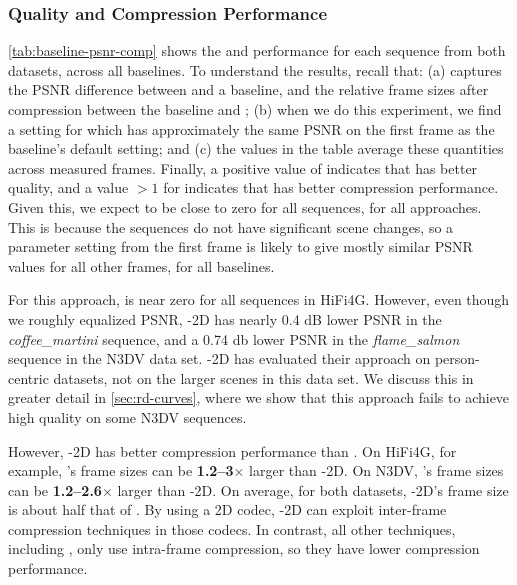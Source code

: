 \subsubsection{Quality and Compression Performance}\label{sec:qual-compr-perf}

\cref{tab:baseline-psnr-comp} shows the \dpsnr{} and \rcr{} performance for each sequence from both datasets, across all baselines.
%
To understand the results, recall that:
%
(a) \dpsnr{} captures the PSNR difference between \gsnfs{} and a baseline, and \rcr{} the relative frame sizes after compression between the baseline and \gsnfs{};
%
(b) when we do this experiment, we find a setting for \gsnfs{} which has approximately the same PSNR on the first frame as the baseline's default setting; and
%
(c) the values in the table average these quantities across measured frames.
%
Finally, a positive value of \dpsnr{} indicates that \gsnfs{} has better quality, and a value $> 1$ for \rcr{} indicates that \gsnfs{} has better compression performance.
Given this, we expect \dpsnr{} to be close to zero for all sequences, for all approaches.
%
This is because the sequences do not have significant scene changes, so a parameter setting from the first frame is likely to give mostly similar PSNR values for all other frames, for all baselines.

%
For this approach, \dpsnr{} is near zero for all sequences in HiFi4G.
%
However, even though we roughly equalized PSNR, \vthree{}-2D has nearly 0.4 dB lower PSNR in the \textit{coffee\_martini} sequence, and a 0.74 db lower PSNR in the \textit{flame\_salmon} sequence in the N3DV data set.
%
\vthree{}-2D has evaluated their approach on person-centric datasets, not on the larger scenes in this data set.
%
We discuss this in greater detail in \cref{sec:rd-curves}, where we show that this approach fails to achieve high quality on some N3DV sequences.

However, \vthree{}-2D has better compression performance than \gsnfs{}.
%
On HiFi4G, for example, \gsnfs{}'s frame sizes can be \textbf{1.2--3}$\times$ larger than \vthree{}-2D.
%
On N3DV, \gsnfs{}'s frame sizes can be \textbf{1.2--2.6}$\times$ larger than \vthree{}-2D.
%
On average, for both datasets, \vthree{}-2D's frame size is about half that of \gsnfs{}.
%
By using a 2D codec, \vthree{}-2D can exploit inter-frame compression techniques in those codecs.
%
In contrast, all other techniques, including \gsnfs{}, only use intra-frame compression, so they have lower compression performance.

